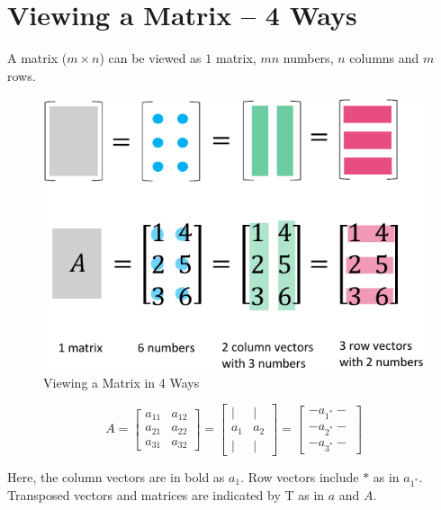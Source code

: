 \documentclass{article}
\begin{document}
\tableofcontents

\section{Viewing a Matrix -- 4 Ways}

A matrix ($m \times n$) can be viewed as $1$ matrix, $mn$ numbers, $n$ columns and $m$ rows.

\begin{figure}[H]
  \centering
  \includegraphics[scale=0.8]{../figz/ViewingMatrix-4Ways}
  \caption{Viewing a Matrix in 4 Ways}
\end{figure}

\begin{equation*}
  A= \begin{bmatrix}
    a_{11} & a_{12}\\
    a_{21} & a_{22}\\
    a_{31} & a_{32}
  \end{bmatrix}
  =
  \begin{bmatrix}
    | & |\\
    a_{1} & a_{2}\\
    | & |
  \end{bmatrix}
  =
  \begin{bmatrix}
    - a_{1^*} -\\
    - a_{2^*} -\\
    - a_{3^*} -
  \end{bmatrix}
\end{equation*}

Here, the column vectors are in bold as $a_{1}$.
Row vectors include $*$ as in $a_{1^*}$.
Transposed vectors and matrices are indicated by $\mathrm{T}$ as
in $a$ and $A$.
\end{document}
